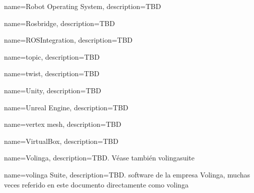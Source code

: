 {
    name={Robot Operating System},
    description={TBD}
}

{
    name={Rosbridge},
    description={TBD}
}

{
    name={ROSIntegration},
    description={TBD}
}



{
    name={topic},
    description={TBD}
}

{
    name={twist},
    description={TBD}
}


{
    name={Unity},
    description={TBD}
}

{
    name={Unreal Engine},
    description={TBD}
}


{
    name={vertex \gls{mesh}},
    description={TBD}
}

{
    name={VirtualBox},
    description={TBD}
}

{
    name={Volinga},
    description={TBD. Véase también \gls{volingasuite}}
}

{
    name={\gls{volinga} Suite},
    description={TBD. software de la empresa Volinga, muchas veces referido en este documento directamente como \gls{volinga}}
}





